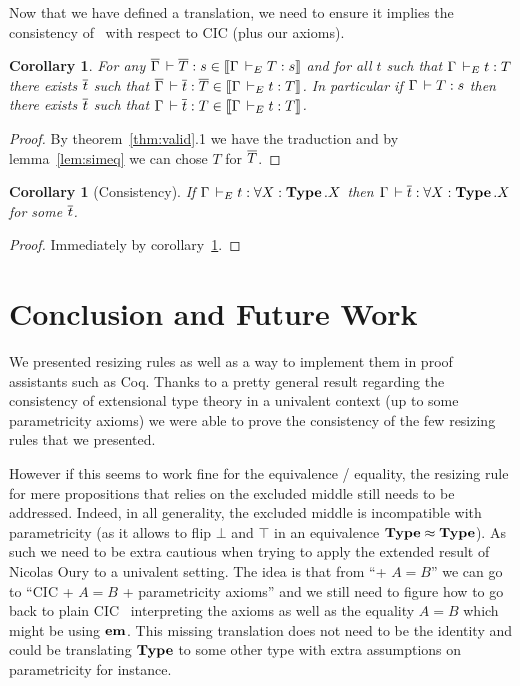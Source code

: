 \documentclass[11pt]{article}
\theoremstyle{plain}
\newtheorem{corollary}[theorem]{Corollary}
\theoremstyle{remark}
\begin{document}
Now that we have defined a translation, we need to ensure it implies the
consistency of \CCe\ with respect to CIC (plus our axioms).

\begin{corollary}
  \label{cor:choice}
  For any $\overline{\Gamma} \,\vdash \overline{T} : s \in \mathopen{{[\kern-0.14em[}} \Gamma \,\vdash_E T : s \mathclose{{]\kern-0.14em]}}$ and for all
  $t$ such that $\Gamma \,\vdash_E t : T$ there exists $\overline{t}$ such that
  $\overline{\Gamma} \,\vdash \overline{t} : \overline{T} \in \mathopen{{[\kern-0.14em[}} \Gamma \,\vdash_E t : T \mathclose{{]\kern-0.14em]}}$.
  In particular if $\Gamma \,\vdash T : s$ then there exists $\overline{t}$ such that
  $\Gamma \,\vdash \overline{t} : T \in \mathopen{{[\kern-0.14em[}} \Gamma \,\vdash_E t : T \mathclose{{]\kern-0.14em]}}$.
\end{corollary}

\begin{proof}
  By theorem~\ref{thm:valid}.1 we have the traduction and by
  lemma~\ref{lem:simeq} we can chose $T$ for $\overline{T}$.
\end{proof}

\begin{corollary}[Consistency]
  If $\Gamma \,\vdash_E t : \forall X:\operatorname{\mathbf{Type}}.X$
  then $\Gamma \,\vdash \overline{t} : \forall X:\operatorname{\mathbf{Type}}.X$ for some $\overline{t}$.
\end{corollary}

\begin{proof}
  Immediately by corollary~\ref{cor:choice}.
\end{proof}

\section*{Conclusion and Future Work}

We presented resizing rules as well as a way to implement them in proof
assistants such as Coq. Thanks to a pretty general result regarding the
consistency of extensional type theory in a univalent context (up to some
parametricity axioms) we were able to prove the consistency of the few
resizing rules that we presented.

However if this seems to work fine for the equivalence / equality, the resizing
rule for mere propositions that relies on the excluded middle still needs to be
addressed. Indeed, in all generality, the excluded middle is incompatible with
parametricity (as it allows to flip $\bot$ and $\top$ in an equivalence
$\operatorname{\mathbf{Type}} \approx \operatorname{\mathbf{Type}}$). As such we need to be extra cautious when trying
to apply the extended result of Nicolas Oury to a univalent setting.
The idea is that from ``\CCe + $A = B$'' we can go to ``CIC + $A = B$ +
parametricity axioms'' and we still need to figure how to go back to plain CIC
\ie\ interpreting the axioms as well as the equality $A = B$ which might be
using $\operatorname{\mathbf{em}}$. This missing translation does not need to be the identity and
could be translating $\operatorname{\mathbf{Type}}$ to some other type with extra assumptions on
parametricity for instance.



\end{document}
